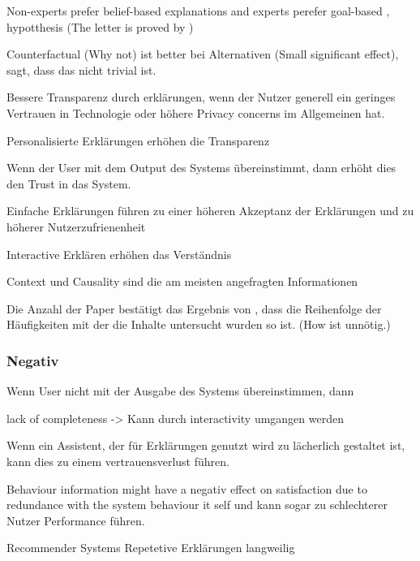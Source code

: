 Non-experts prefer belief-based explanations and experts perefer goal-based \cite{kaptein_personalised_2017}, hypotthesis (The letter is proved by \cite{martin_evaluating_2021})

Counterfactual (Why not) ist better bei Alternativen \cite{martin_evaluating_2021}  \cite{neerincx_using_2018} \cite{schrills_color_2020} (Small significant effect), \cite{lim_2009_assessing} sagt, dass das nicht trivial ist.

Bessere Transparenz durch erklärungen, wenn der Nutzer generell ein geringes Vertrauen in Technologie oder höhere Privacy concerns im Allgemeinen hat. \cite{tsai_effects_2020}

Personalisierte Erklärungen erhöhen die Transparenz \cite{sokol_one_2020, wiegand2019drive}

Wenn der User mit dem Output des Systems übereinstimmt, dann erhöht dies den Trust in das System. \cite{schrills_color_2020}

Einfache Erklärungen führen zu einer höheren Akzeptanz der Erklärungen und zu höherer Nutzerzufrienenheit \cite{hleg2019policy, sovrano_modelling_2020}

Interactive Erklären erhöhen das Verständnis \cite{cheng2019explaining}

Context und Causality sind die am meisten angefragten Informationen \cite{chazette_end-users_nodate}

Die Anzahl der Paper bestätigt das Ergebnis von \cite{chazette_end-users_nodate}, dass die Reihenfolge der Häufigkeiten mit der die Inhalte untersucht wurden so ist. (How ist unnötig.)

\subsubsection*{Negativ}

Wenn User nicht mit der Ausgabe des Systems übereinstimmen, dann 

lack of completeness \cite{chazette_end-users_nodate} -> Kann durch interactivity umgangen werden

Wenn ein Assistent, der für Erklärungen genutzt wird zu lächerlich gestaltet ist, kann dies zu einem vertrauensverlust führen. \cite{wang_is_2018}

Behaviour information might have a negativ effect on satisfaction due to redundance with the system behaviour it self und kann sogar zu schlechterer Nutzer Performance führen. \cite{koo_why_2015}

Recommender Systems Repetetive Erklärungen \glqq langweilig\grqq{}


